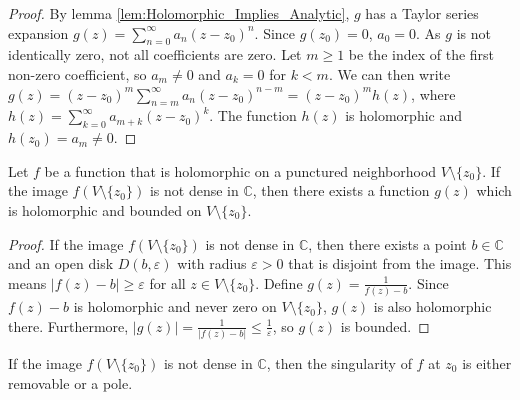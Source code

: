 \begin{proof}
    By lemma \ref{lem:Holomorphic_Implies_Analytic}, $g$ has a Taylor series expansion $g(z) = \sum_{n=0}^{\infty} a_n (z-z_0)^n$. Since $g(z_0)=0$, $a_0=0$. As $g$ is not identically zero, not all coefficients are zero. Let $m \geq 1$ be the index of the first non-zero coefficient, so $a_m \neq 0$ and $a_k=0$ for $k < m$. We can then write $g(z) = (z-z_0)^m \sum_{n=m}^{\infty} a_n (z-z_0)^{n-m} = (z-z_0)^m h(z)$, where $h(z) = \sum_{k=0}^{\infty} a_{m+k} (z-z_0)^k$. The function $h(z)$ is holomorphic and $h(z_0) = a_m \neq 0$.
\end{proof}

\begin{lemma}
    \label{lem:Bounded_Auxiliary_Function}
    Let $f$ be a function that is holomorphic on a punctured neighborhood $V \setminus \{z_0\}$. If the image $f(V \setminus \{z_0\})$ is not dense in $\mathbb{C}$, then there exists a function $g(z)$ which is holomorphic and bounded on $V \setminus \{z_0\}$.
\end{lemma}

\begin{proof}
    If the image $f(V \setminus \{z_0\})$ is not dense in $\mathbb{C}$, then there exists a point $b \in \mathbb{C}$ and an open disk $D(b, \varepsilon)$ with radius $\varepsilon > 0$ that is disjoint from the image. This means $|f(z) - b| \geq \varepsilon$ for all $z \in V \setminus \{z_0\}$.
    Define $g(z) = \frac{1}{f(z) - b}$. Since $f(z) - b$ is holomorphic and never zero on $V \setminus \{z_0\}$, $g(z)$ is also holomorphic there. Furthermore, $|g(z)| = \frac{1}{|f(z) - b|} \leq \frac{1}{\varepsilon}$, so $g(z)$ is bounded.
\end{proof}

\begin{lemma}
    \label{lem:Classification_of_f}
    If the image $f(V \setminus \{z_0\})$ is not dense in $\mathbb{C}$, then the singularity of $f$ at $z_0$ is either removable or a pole.
\end{lemma}

